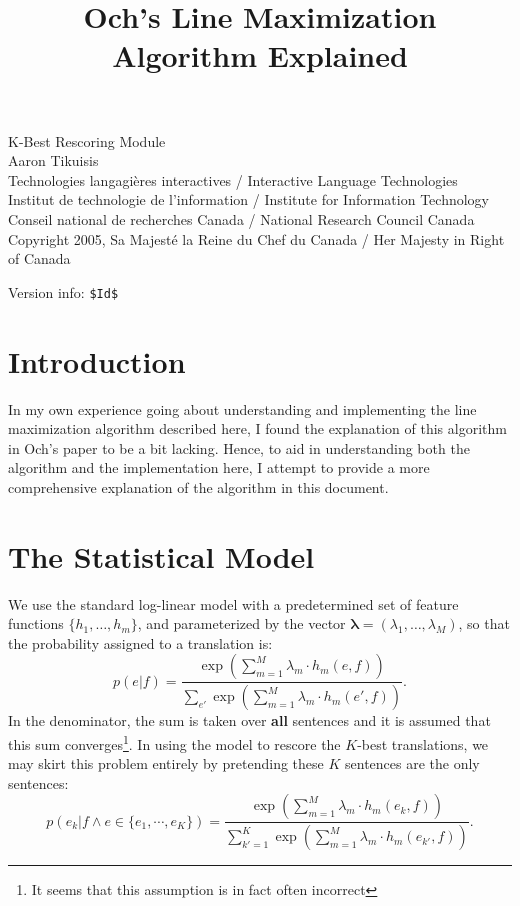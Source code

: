 \documentclass[12pt]{amsart}
\begin{document}
\title{Och's Line Maximization Algorithm Explained}
\maketitle

{\tiny
\noindent
K-Best Rescoring Module\\
Aaron Tikuisis\\
Technologies langagi{\`e}res interactives / Interactive Language Technologies\\
Institut de technologie de l'information / Institute for Information Technology\\
Conseil national de recherches Canada / National Research Council Canada\\
Copyright 2005, Sa Majest{\'e} la Reine du Chef du Canada / Her Majesty in Right of Canada
}

{\tiny
\noindent
Version info: \verb+$Id$+
}
\\

\section{Introduction\label{sec:intro}}
In my own experience going about understanding and implementing the line maximization algorithm described here, I found the explanation of this algorithm in Och's paper to be a bit lacking.
Hence, to aid in understanding both the algorithm and the implementation here, I attempt to provide a more comprehensive explanation of the algorithm in this document.

\section{The Statistical Model\label{sec:model}}
We use the standard log-linear model with a predetermined set of feature functions $\{h_1, \dots , h_m\}$, and parameterized by the vector $\boldsymbol{\lambda} = (\lambda_1, \dots , \lambda_M)$, so that the probability assigned to a translation is:
\[ p(e|f) = \frac
{\exp \left( \sum_{m=1}^M \lambda_m \cdot h_m(e,f) \right)}
{\sum_{e'} \exp \left( \sum_{m=1}^M \lambda_m \cdot h_m(e',f) \right)}. \]
In the denominator, the sum is taken over \textbf{all} sentences and it is assumed that this sum converges\footnote{It seems that this assumption is in fact often incorrect}.
In using the model to rescore the $K$-best translations, we may skirt this problem entirely by pretending these $K$ sentences are the only sentences:
\[ p(e_k|f \land e \in \{e_1, \cdots , e_K\}) = \frac
{\exp \left( \sum_{m=1}^M \lambda_m \cdot h_m(e_k,f) \right)}
{\sum_{k'=1}^K \exp \left( \sum_{m=1}^M \lambda_m \cdot h_m(e_{k'},f) \right)}. \]
\end{document}
